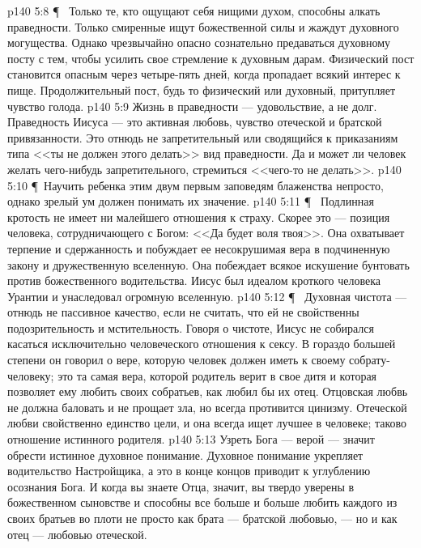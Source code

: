 \vs p140 5:8 \P\ \bibnobreakspace {} Только те, кто ощущают себя нищими духом, способны алкать праведности. Только смиренные ищут божественной силы и жаждут духовного могущества. Однако чрезвычайно опасно сознательно предаваться духовному посту с тем, чтобы усилить свое стремление к духовным дарам. Физический пост становится опасным через четыре\hyp{}пять дней, когда пропадает всякий интерес к пище. Продолжительный пост, будь то физический или духовный, притупляет чувство голода.
\vs p140 5:9 Жизнь в праведности --- удовольствие, а не долг. Праведность Иисуса --- это активная любовь, чувство отеческой и братской привязанности. Это отнюдь не запретительный или сводящийся к приказаниям типа <<ты не должен этого делать>> вид праведности. Да и может ли человек желать чего\hyp{}нибудь запретительного, стремиться <<чего\hyp{}то не делать>>.
\vs p140 5:10 \P\ Научить ребенка этим двум первым заповедям блаженства непросто, однако зрелый ум должен понимать их значение.
\vs p140 5:11 \P\ \bibnobreakspace {} Подлинная кротость не имеет ни малейшего отношения к страху. Скорее это --- позиция человека, сотрудничающего с Богом: <<Да будет воля твоя>>. Она охватывает терпение и сдержанность и побуждает ее несокрушимая вера в подчиненную закону и дружественную вселенную. Она побеждает всякое искушение бунтовать против божественного водительства. Иисус был идеалом кроткого человека Урантии и унаследовал огромную вселенную.
\vs p140 5:12 \P\ \bibnobreakspace {} Духовная чистота --- отнюдь не пассивное качество, если не считать, что ей не свойственны подозрительность и мстительность. Говоря о чистоте, Иисус не собирался касаться исключительно человеческого отношения к сексу. В гораздо большей степени он говорил о вере, которую человек должен иметь к своему собрату\hyp{}человеку; это та самая вера, которой родитель верит в свое дитя и которая позволяет ему любить своих собратьев, как любил бы их отец. Отцовская любвь не должна баловать и не прощает зла, но всегда противится цинизму. Отеческой любви свойственно единство цели, и она всегда ищет лучшее в человеке; таково отношение истинного родителя.
\vs p140 5:13 Узреть Бога --- верой --- значит обрести истинное духовное понимание. Духовное понимание укрепляет водительство Настройщика, а это в конце концов приводит к углублению осознания Бога. И когда вы знаете Отца, значит, вы твердо уверены в божественном сыновстве и способны все больше и больше любить каждого из своих братьев во плоти не просто как брата --- братской любовью, --- но и как отец --- любовью отеческой.
